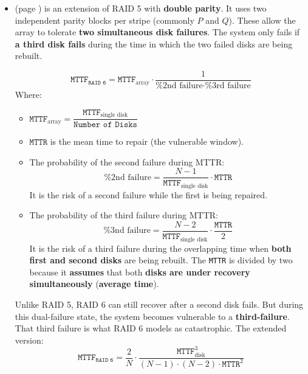 \begin{itemize}
\begin{itemize}
        \item {} (page ) is an extension of RAID 5 with \textbf{double parity}. It uses two independent parity blocks per stripe (commonly $P$ and $Q$). These allow the array to tolerate \textbf{two simultaneous disk failures}. The system only fails if \textbf{a third disk fails} during the time in which the two failed disks are being rebuilt.

        \begin{equation}
            \texttt{MTTF}_{\texttt{RAID 6}} = \texttt{MTTF}_{\text{array}} \cdot \dfrac{1}{
                \text{\% 2nd failure} \cdot \text{\% 3rd failure}
            }
        \end{equation}
        Where:
        \begin{itemize}
            \item $\texttt{MTTF}_{\text{array}} = \dfrac{\texttt{MTTF}_{\text{single disk}}}{\texttt{Number of Disks}}$
            \item $\texttt{MTTR}$ is the mean time to repair (the vulnerable window).
            \item The probability of the second failure during MTTR:
            \begin{equation}
                \text{\% 2nd failure} = \dfrac{N-1}{\texttt{MTTF}_{\text{single disk}}} \cdot \texttt{MTTR}
            \end{equation}
            It is the risk of a second failure while the first is being repaired.
            \item The probability of the third failure during MTTR:
            \begin{equation}
                \text{\% 3nd failure} = \dfrac{N-2}{\texttt{MTTF}_{\text{single disk}}} \cdot \dfrac{\texttt{MTTR}}{2}
            \end{equation}
            It is the risk of a third failure during the overlapping time when \textbf{both first and second disks} are being rebuilt. The \texttt{MTTR} is divided by two because it \textbf{assumes} that both \textbf{disks are under recovery simultaneously} (\textbf{average time}).
        \end{itemize}
        Unlike RAID 5, RAID 6 can still recover after a second disk fails. But during this dual-failure state, the system becomes vulnerable to a \textbf{third-failure}. That third failure is what RAID 6 models as catastrophic. The extended version:
        \begin{equation}\label{eq: RAID 6 - MTTF}
            \texttt{MTTF}_{\texttt{RAID 6}} = \dfrac{2}{N} \cdot \dfrac{\texttt{MTTF}_{\text{disk}}^{3}}{\left(N-1\right) \cdot \left(N-2\right) \cdot \texttt{MTTR}^{2}}
        \end{equation}
    \end{itemize}
\end{itemize}

